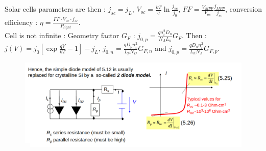 \documentclass[../main.tex]{subfiles}
\begin{document}
 Solar cells parameters are then : $j_{sc} = j_L$, $V_{oc} = \frac{kT}{q} \ln \frac{j_{sc}}{j_0}$, $FF = \frac{V_{MPP}}{V_{oc}} \frac{j_{MPP}}{j_{sc}}$, conversion efficiency : $\eta = \frac{FF\cdot V_{oc}\cdot j_{sc}}{P_{light}}$.\\

 Cell is not infinite : Geometry factor $G_F$ : $j_{0,p} = \frac{qn_i^2D_n}{N_A L_n} G_F$. Then : $j(V) = j_0 [\exp\frac{qV}{kT} -1]-j_L$, $j_{0,n} = \frac{qD_pn_i^2}{L_p N_D}G_{F,n}$ and $j_{0,p} = \frac{qD_nn_i^2}{L_n N_A}G_{F,p}$.\\

 \begin{figure}[hbt!]
     \centering
     \includegraphics[width=0.5\linewidth]{IMAGES/PV/Screenshot from 2025-04-08 14-59-02.png}
 \end{figure}
\end{document}
